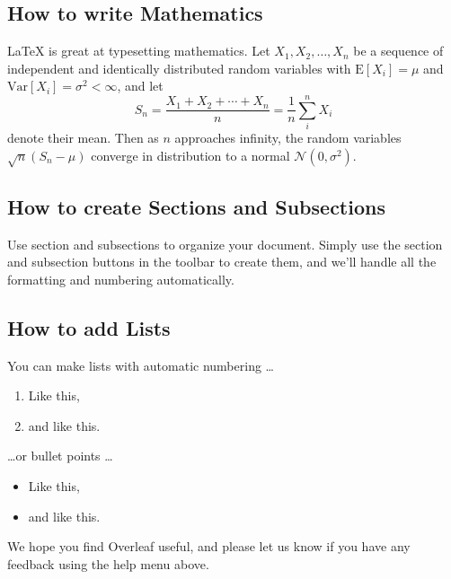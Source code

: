 \documentclass{article}
\begin{document}
\subsection{How to write Mathematics}

\LaTeX{} is great at typesetting mathematics. Let $X_1, X_2, \ldots, X_n$ be a sequence of independent and identically distributed random variables with $\text{E}[X_i] = \mu$ and $\text{Var}[X_i] = \sigma^2 < \infty$, and let
$$S_n = \frac{X_1 + X_2 + \cdots + X_n}{n}
      = \frac{1}{n}\sum_{i}^{n} X_i$$
denote their mean. Then as $n$ approaches infinity, the random variables $\sqrt{n}(S_n - \mu)$ converge in distribution to a normal $\mathcal{N}(0, \sigma^2)$.


\subsection{How to create Sections and Subsections}

Use section and subsections to organize your document. Simply use the section and subsection buttons in the toolbar to create them, and we'll handle all the formatting and numbering automatically.

\subsection{How to add Lists}

You can make lists with automatic numbering \dots

\begin{enumerate}
\item Like this,
\item and like this.
\end{enumerate}
\dots or bullet points \dots
\begin{itemize}
\item Like this,
\item and like this.
\end{itemize}

We hope you find Overleaf useful, and please let us know if you have any feedback using the help menu above.
\end{document}
